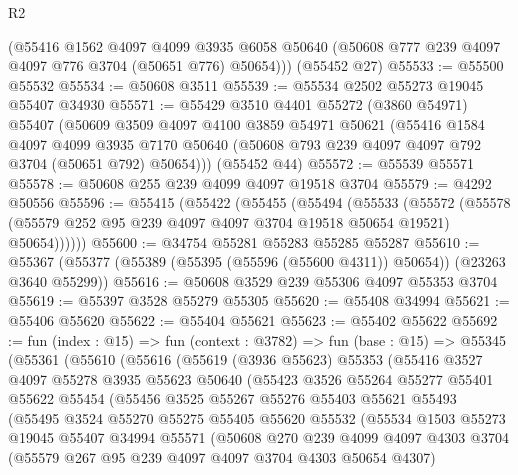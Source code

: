 \begin{lexlean}{R2}
\begin{coremodule}
      (@55416
        @1562
        @4097
        @4099
        @3935
        @6058
        @50640
        (@50608 @777 @239 @4097 @4097 @776 @3704 (@50651 @776) @50654)))
    (@55452 @27)
@55533 := @55500 @55532
@55534 := @50608 @3511
@55539 := @55534 @2502 @55273 @19045 @55407 @34930
@55571 := @55429
    @3510
    @4401
    @55272
    (@3860 @54971)
    @55407
    (@50609
      @3509
      @4097
      @4100
      @3859
      @54971
      @50621
      (@55416
        @1584
        @4097
        @4099
        @3935
        @7170
        @50640
        (@50608 @793 @239 @4097 @4097 @792 @3704 (@50651 @792) @50654)))
    (@55452 @44)
@55572 := @55539 @55571
@55578 := @50608 @255 @239 @4099 @4097 @19518 @3704
@55579 := @4292 @50556
@55596 := @55415
    (@55422
      (@55455
        (@55494
          (@55533
            (@55572
              (@55578 (@55579 @252 @95 @239 @4097 @4097 @3704 @19518 @50654 @19521) @50654))))))
@55600 := @34754 @55281 @55283 @55285 @55287
@55610 := @55367 (@55377 (@55389 (@55395 (@55596 (@55600 @4311)) @50654)) (@23263 @3640 @55299))
@55616 := @50608 @3529 @239 @55306 @4097 @55353 @3704
@55619 := @55397 @3528 @55279 @55305
@55620 := @55408 @34994
@55621 := @55406 @55620
@55622 := @55404 @55621
@55623 := @55402 @55622
@55692 := fun (index : @15) =>
  fun (context : @3782) =>
  fun (base : @15) =>
  @55345
    (@55361
      (@55610
        (@55616
          (@55619
            (@3936 @55623)
            @55353
            (@55416
              @3527
              @4097
              @55278
              @3935
              @55623
              @50640
              (@55423
                @3526
                @55264
                @55277
                @55401
                @55622
                @55454
                (@55456
                  @3525
                  @55267
                  @55276
                  @55403
                  @55621
                  @55493
                  (@55495
                    @3524
                    @55270
                    @55275
                    @55405
                    @55620
                    @55532
                    (@55534
                      @1503
                      @55273
                      @19045
                      @55407
                      @34994
                      @55571
                      (@50608
                        @270
                        @239
                        @4099
                        @4097
                        @4303
                        @3704
                        (@55579 @267 @95 @239 @4097 @4097 @3704 @4303 @50654 @4307)

\end{coremodule}
\end{lexlean}
